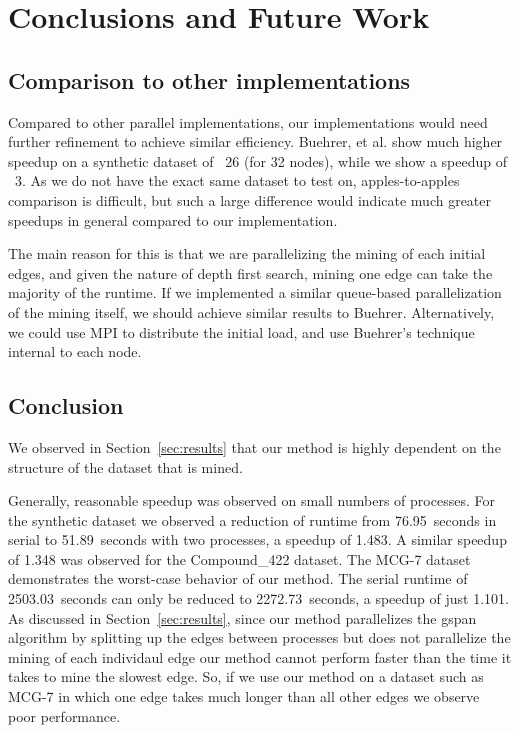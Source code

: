 \section{Conclusions and Future Work}
\label{sec:conclusions}

\subsection{Comparison to other implementations}
\label{subsec:comparison}

Compared to other parallel implementations, our implementations would need
further refinement to achieve similar efficiency.  Buehrer, et al. show
much higher speedup on a synthetic dataset of ~26 (for 32 nodes), while 
we show a speedup of ~3.  As we do not have the exact same dataset to test
on, apples-to-apples comparison is difficult, but such a large difference
would indicate much greater speedups in general compared to our 
implementation.   

The main reason for this is that we are parallelizing the mining of each 
initial edges, and given the nature of depth first search, mining one edge 
can take the majority of the runtime.  If we implemented a similar 
queue-based parallelization of the mining itself, we should achieve similar 
results to Buehrer.  Alternatively, we could use MPI to distribute the 
initial load, and use Buehrer's technique internal to each node.  

\subsection{Conclusion}
\label{subsec:conclusions}

We observed in Section~\ref{sec:results} that our method is highly dependent
on the structure of the dataset that is mined.

Generally, reasonable speedup was observed on small numbers of processes. For
the synthetic dataset we observed a reduction of runtime from 76.95~seconds
in serial to 51.89~seconds with two processes, a speedup of 1.483. A similar
speedup of 1.348 was observed for the Compound\_422 dataset. The MCG-7 dataset
demonstrates the worst-case behavior of our method. The serial runtime of
2503.03~seconds can only be reduced to 2272.73~seconds, a speedup of just
1.101. As discussed in Section~\ref{sec:results}, since our method
parallelizes the gspan algorithm by splitting up the edges between processes
but does not parallelize the mining of each individaul edge our method cannot
perform faster than the time it takes to mine the slowest edge. So, if we
use our method on a dataset such as MCG-7 in which one edge takes much longer
than all other edges we observe poor performance.

